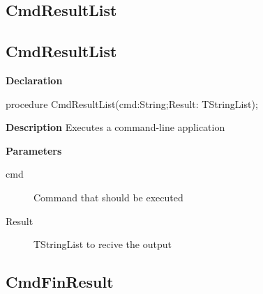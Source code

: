 \documentclass{report}
\newif\ifpdf
\begin{document}
\subsection*{\large{\textbf{CmdResultList}}\normalsize\hspace{1ex}\hrulefill}
\else
\subsection*{CmdResultList}
\fi
\label{licommon-CmdResultList}
\begin{list}{}{
\setlength{\itemindent}{0cm}
\setlength{\listparindent}{0cm}
\setlength{\leftmargin}{\evensidemargin}
\addtolength{\leftmargin}{\tmplength}
\settowidth{\labelsep}{X}
\addtolength{\leftmargin}{\labelsep}
\setlength{\labelwidth}{\tmplength}
}
\item[\textbf{Declaration}\hfill]
\ifpdf
\begin{flushleft}
\fi
\begin{ttfamily}
procedure CmdResultList(cmd:String;Result: TStringList);\end{ttfamily}

\ifpdf
\end{flushleft}
\fi

\par
\item[\textbf{Description}]
Executes a command{-}line application  \par
\item[\textbf{Parameters}]
\begin{description}
\item[cmd] Command that should be executed
\item[Result] TStringList to recive the output
\end{description}


\end{list}
\ifpdf
\subsection*{\large{\textbf{CmdFinResult}}\normalsize\hspace{1ex}\hrulefill}
\else
\end{document}
